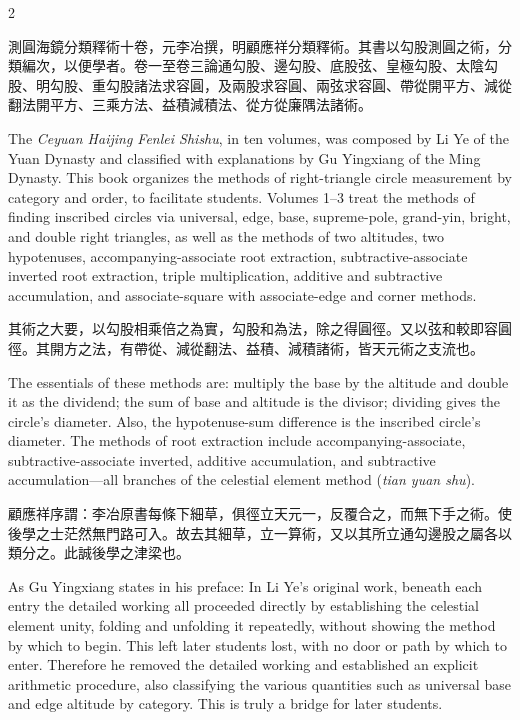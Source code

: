 \documentclass[11pt,a4paper]{article}
\begin{document}
\begin{paracol}{2}

測圓海鏡分類釋術十卷，元李冶撰，明顧應祥分類釋術。其書以勾股測圓之術，分類編次，以便學者。卷一至卷三論通勾股、邊勾股、底股弦、皇極勾股、太陰勾股、明勾股、重勾股諸法求容圓，及兩股求容圓、兩弦求容圓、帶從開平方、減從翻法開平方、三乘方法、益積減積法、從方從廉隅法諸術。

\switchcolumn

The \textit{Ceyuan Haijing Fenlei Shishu}, in ten volumes, was composed by Li Ye of the Yuan Dynasty and classified with explanations by Gu Yingxiang of the Ming Dynasty. This book organizes the methods of right-triangle circle measurement by category and order, to facilitate students. Volumes 1--3 treat the methods of finding inscribed circles via universal, edge, base, supreme-pole, grand-yin, bright, and double right triangles, as well as the methods of two altitudes, two hypotenuses, accompanying-associate root extraction, subtractive-associate inverted root extraction, triple multiplication, additive and subtractive accumulation, and associate-square with associate-edge and corner methods.

\switchcolumn

其術之大要，以勾股相乘倍之為實，勾股和為法，除之得圓徑。又以弦和較即容圓徑。其開方之法，有帶從、減從翻法、益積、減積諸術，皆天元術之支流也。

\switchcolumn

The essentials of these methods are: multiply the base by the altitude and double it as the dividend; the sum of base and altitude is the divisor; dividing gives the circle's diameter. Also, the hypotenuse-sum difference is the inscribed circle's diameter. The methods of root extraction include accompanying-associate, subtractive-associate inverted, additive accumulation, and subtractive accumulation---all branches of the celestial element method (\textit{tian yuan shu}).

\switchcolumn

顧應祥序謂：李冶原書每條下細草，俱徑立天元一，反覆合之，而無下手之術。使後學之士茫然無門路可入。故去其細草，立一算術，又以其所立通勾邊股之屬各以類分之。此誠後學之津梁也。

\switchcolumn

As Gu Yingxiang states in his preface: In Li Ye's original work, beneath each entry the detailed working all proceeded directly by establishing the celestial element unity, folding and unfolding it repeatedly, without showing the method by which to begin. This left later students lost, with no door or path by which to enter. Therefore he removed the detailed working and established an explicit arithmetic procedure, also classifying the various quantities such as universal base and edge altitude by category. This is truly a bridge for later students.


\end{paracol}
\end{document}
